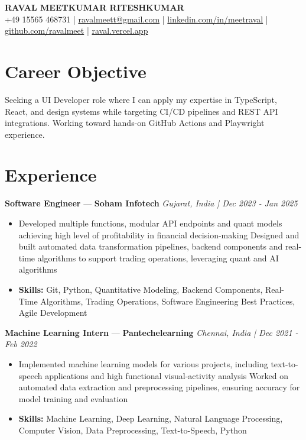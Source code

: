 \documentclass[a4paper,10pt]{article}
\begin{document}
\begin{center}
  {\Large\bfseries RAVAL MEETKUMAR RITESHKUMAR}\\[2pt]
  {\small +49 15565 468731 \;|\; \href{mailto:ravalmeett@gmail.com}{ravalmeett@gmail.com} \;|\; \href{https://www.linkedin.com/in/meetraval/}{linkedin.com/in/meetraval} \;|\; \href{https://github.com/ravalmeet}{github.com/ravalmeet} \;|\; \href{https://raval.vercel.app/}{raval.vercel.app}}
\end{center}
\vspace{-3pt}

\section*{Career Objective}
Seeking a UI Developer role where I can apply my expertise in TypeScript, React, and design systems while targeting CI/CD pipelines and REST API integrations. Working toward hands-on GitHub Actions and Playwright experience.\par

\section*{Experience}
\textbf{Software Engineer} — \textbf{Soham Infotech} \hfill \textit{Gujarat, India \;|\; Dec 2023 - Jan 2025}\par
\vspace{1pt}
\begin{itemize}
  \item Developed multiple functions, modular API endpoints and quant models achieving high level of profitability in financial decision-making Designed and built automated data transformation pipelines, backend components and real-time algorithms to support trading operations, leveraging quant and AI algorithms
  \item \textbf{Skills:} Git, Python, Quantitative Modeling, Backend Components, Real-Time Algorithms, Trading Operations, Software Engineering Best Practices, Agile Development
\end{itemize}
\vspace{3pt}
\textbf{Machine Learning Intern} — \textbf{Pantechelearning} \hfill \textit{Chennai, India \;|\; Dec 2021 - Feb 2022}\par
\vspace{1pt}
\begin{itemize}
  \item Implemented machine learning models for various projects, including text-to-speech applications and high functional visual-activity analysis Worked on automated data extraction and preprocessing pipelines, ensuring accuracy for model training and evaluation
  \item \textbf{Skills:} Machine Learning, Deep Learning, Natural Language Processing, Computer Vision, Data Preprocessing, Text-to-Speech, Python
\end{itemize}
\end{document}
